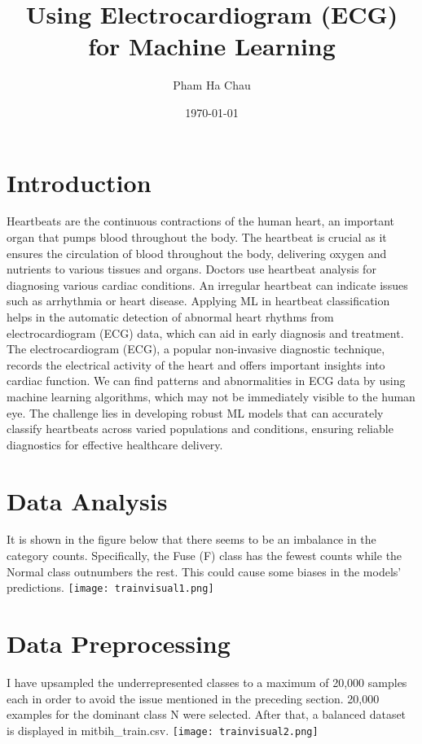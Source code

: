 \documentclass{article}
\title{Using Electrocardiogram (ECG) for Machine Learning}
\author{Pham Ha Chau}
\date{\today}
\begin{document}
\maketitle

\begin{multicols}{2}

\section{Introduction}
Heartbeats are the continuous contractions of the human heart, an important organ that pumps blood throughout the body. The heartbeat is crucial as it ensures the circulation of blood throughout the body, delivering oxygen and nutrients to various tissues and organs. Doctors use heartbeat analysis for diagnosing various cardiac conditions. An irregular heartbeat can indicate issues such as arrhythmia or heart disease. 
Applying ML in heartbeat classification helps in the automatic detection of abnormal heart rhythms from electrocardiogram (ECG) data, which can aid in early diagnosis and treatment. The electrocardiogram (ECG), a popular non-invasive diagnostic technique, records the electrical activity of the heart and offers important insights into cardiac function. We can find patterns and abnormalities in ECG data by using machine learning algorithms, which may not be immediately visible to the human eye. The challenge lies in developing robust ML models that can accurately classify heartbeats across varied populations and conditions, ensuring reliable diagnostics for effective healthcare delivery.

\section{Data Analysis}
It is shown in the figure below that there seems to be an imbalance in the category counts. Specifically, the Fuse (F) class has the fewest counts while the Normal class outnumbers the rest. This could cause some biases in the models' predictions.
\texttt{[image: trainvisual1.png]}
    \label{fig:train}
\section{Data Preprocessing}
I have upsampled the underrepresented classes to a maximum of 20,000 samples each in order to avoid the issue mentioned in the preceding section. 20,000 examples for the dominant class N were selected. After that, a balanced dataset is displayed in mitbih\_train.csv.
\texttt{[image: trainvisual2.png]}
    \label{fig:train resample}

\end{multicols}
\end{document}
